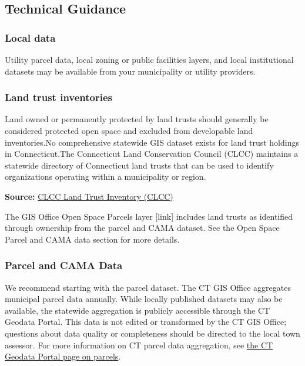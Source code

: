 \documentclass[
  letterpaper,
  DIV=11,
  numbers=noendperiod]{scrreprt}
\begin{document}
\subsection{Technical Guidance}\label{technical-guidance-1}

\subsubsection{Local data}\label{sec-local-data2}

Utility parcel data, local zoning or public facilities layers, and local
institutional datasets may be available from your municipality or
utility providers.

\subsubsection{Land trust inventories}\label{sec-land-trust-inventories}

Land owned or permanently protected by land trusts should generally be
considered protected open space and excluded from developable land
inventories.No comprehensive statewide GIS dataset exists for land trust
holdings in Connecticut.The Connecticut Land Conservation Council (CLCC)
maintains a statewide directory of Connecticut land trusts that can be
used to identify organizations operating within a municipality or
region.

\textbf{Source:}
\href{https://ctconservation.org/what-is-a-land-trust/\#maps}{CLCC Land
Trust Inventory (CLCC)}

The GIS Office Open Space Parcels layer {[}link{]} includes land trusts
as identified through ownership from the parcel and CAMA dataset. See
the Open Space Parcel and CAMA data section for more details.

\subsubsection{Parcel and CAMA Data}\label{sec-parcel-and-cama-data2}

We recommend starting with the parcel dataset. The CT GIS Office
aggregates municipal parcel data annually. While locally published
datasets may also be available, the statewide aggregation is publicly
accessible through the CT Geodata Portal. This data is not edited or
transformed by the CT GIS Office; questions about data quality or
completeness should be directed to the local town assessor. For more
information on CT parcel data aggregation, see
\href{https://geodata.ct.gov/pages/parcels}{the CT Geodata Portal page
on parcels}.
\end{document}
